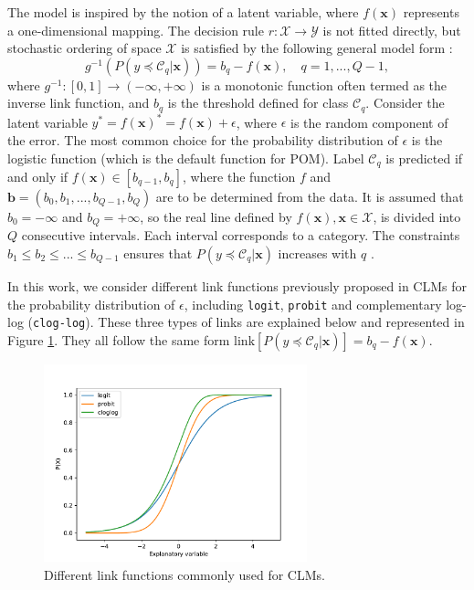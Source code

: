 \documentclass[journal]{IEEEtran}
\begin{document}
	The model is inspired by the notion of a latent variable, where $f(\textbf{x})$ represents a one-dimensional mapping. The decision rule $r: \mathcal{X} \rightarrow \mathcal{Y}$ is not fitted directly, but stochastic ordering of space $\mathcal{X}$ is satisfied by the following general model form \cite{herbrich2000large}:
	\begin{equation}
		\nonumber
		g^{-1}(P(y \preceq \mathcal{C}_q | \mathbf{x})) = b_q - f(\mathbf{x}), \quad q = 1, ..., Q-1,
	\end{equation}
	where $g^{-1} : [0,1] \rightarrow (-\infty, +\infty)$ is a monotonic function often termed as the inverse link function, and $b_q$ is the threshold defined for class $\mathcal{C}_q$. Consider the latent variable $y^* = f(\mathbf{x})^* = f(\mathbf{x}) + \epsilon$, where $\epsilon$ is the random component of the error. The most common choice for the probability distribution of $\epsilon$ is the logistic function (which is the default function for POM). Label $\mathcal{C}_q$ is predicted if and only if $f(\mathbf{x}) \in [b_{q-1}, b_q]$, where the function $f$ and $\mathbf{b} = (b_0, b_1, ..., b_{Q-1}, b_Q)$ are to be determined from the data. It is assumed that $b_0 = -\infty$ and $b_Q = +\infty$, so the real line defined by $f(\textbf{x}), \textbf{x} \in \mathcal{X}$, is divided into $Q$ consecutive intervals. Each interval corresponds to a category. The constraints $b_1 \le b_2 \le ... \le b_{Q-1}$ ensures that $P(y \preceq \mathcal{C}_q | \mathbf{x})$ increases with $q$ \cite{mccullagh1980regression}.
	
	In this work, we consider different link functions previously proposed in CLMs for the probability distribution of $\epsilon$, including \texttt{logit}, \texttt{probit} and complementary log-log (\texttt{clog-log}). These three types of links are explained below and represented in Figure \ref{fig:linkfunctions}. They all follow the same form $\text{link}[P(y \preceq \mathcal{C}_q | \mathbf{x})] = b_q - f(\mathbf{x})$.
			
	\begin{figure}[!t]
		\centering
		\includegraphics[width=3in]{img/linkfunctions.pdf}
		\caption{Different link functions commonly used for CLMs.}
		\label{fig:linkfunctions}
	\end{figure}
\end{document}
